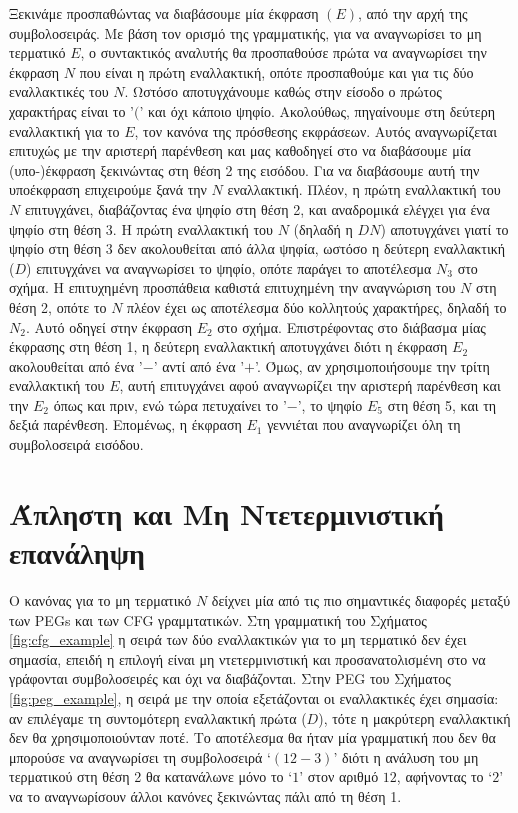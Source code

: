 \documentclass[diploma]{softlab-thesis}
\begin{document}
Ξεκινάμε προσπαθώντας να διαβάσουμε μία έκφραση $(E)$, από την αρχή της συμβολοσειράς.
Με βάση τον ορισμό της γραμματικής, για να αναγνωρίσει το μη τερματικό $E$, ο συντακτικός αναλυτής θα προσπαθούσε πρώτα να αναγνωρίσει την έκφραση $N$ που είναι η πρώτη εναλλακτική, οπότε προσπαθούμε και για τις δύο εναλλακτικές του $N$. Ωστόσο αποτυγχάνουμε καθώς στην είσοδο ο πρώτος χαρακτήρας είναι το '$($' και όχι κάποιο ψηφίο. 
Ακολούθως, πηγαίνουμε στη δεύτερη εναλλακτική για το $E$, τον κανόνα της πρόσθεσης εκφράσεων. 
Αυτός αναγνωρίζεται επιτυχώς με την αριστερή παρένθεση και μας καθοδηγεί στο να διαβάσουμε μία (υπο-)έκφραση ξεκινώντας στη θέση 2 της εισόδου.
Για να διαβάσουμε αυτή την υποέκφραση επιχειρούμε ξανά την $N$ εναλλακτική.
Πλέον, η πρώτη εναλλακτική του $N$ επιτυγχάνει, διαβάζοντας ένα ψηφίο στη θέση 2, και αναδρομικά ελέγχει για ένα ψηφίο στη θέση 3. 
Η πρώτη εναλλακτική του $N$ (δηλαδή η $D N$) αποτυγχάνει γιατί το ψηφίο στη θέση 3 δεν ακολουθείται από άλλα ψηφία, ωστόσο η δεύτερη εναλλακτική ($D$) επιτυγχάνει να αναγνωρίσει το ψηφίο, οπότε παράγει το αποτέλεσμα $N_3$ στο σχήμα. 
Η επιτυχημένη προσπάθεια καθιστά επιτυχημένη την αναγνώριση του $N$ στη θέση 2, οπότε το $N$ πλέον έχει ως αποτέλεσμα δύο κολλητούς χαρακτήρες, δηλαδή το $N_2$.
Αυτό οδηγεί στην έκφραση $E_2$ στο σχήμα. 
Επιστρέφοντας στο διάβασμα μίας έκφρασης στη θέση 1, η δεύτερη εναλλακτική αποτυγχάνει διότι η έκφραση $E_2$ ακολουθείται από ένα '$-$' αντί από ένα '$+$'.
Όμως, αν χρησιμοποιήσουμε την τρίτη εναλλακτική του $E$, αυτή επιτυγχάνει αφού αναγνωρίζει την αριστερή παρένθεση και την $E_2$ όπως και πριν, ενώ τώρα πετυχαίνει το '$-$', το ψηφίο $E_5$ στη θέση 5, και τη δεξιά παρένθεση. 
Επομένως, η έκφραση $E_1$ γεννιέται που αναγνωρίζει όλη τη συμβολοσειρά εισόδου.

\section{Άπληστη και Μη Ντετερμινιστική επανάληψη}
Ο κανόνας για το μη τερματικό $N$ δείχνει μία από τις πιο σημαντικές διαφορές μεταξύ των PEGs και των CFG γραμμτατικών.
Στη γραμματική του Σχήματος \ref{fig:cfg_example} η σειρά των δύο εναλλακτικών για το μη τερματικό δεν έχει σημασία, επειδή η επιλογή είναι μη ντετερμινιστική και προσανατολισμένη στο να γράφονται συμβολοσειρές και όχι να διαβάζονται.
Στην PEG του Σχήματος \ref{fig:peg_example}, η σειρά με την οποία εξετάζονται οι εναλλακτικές έχει σημασία: αν επιλέγαμε τη συντομότερη εναλλακτική πρώτα ($D$), τότε η μακρύτερη εναλλακτική δεν θα χρησιμοποιούνταν ποτέ.
Το αποτέλεσμα θα ήταν μία γραμματική που δεν θα μπορούσε να αναγνωρίσει τη συμβολοσειρά `$(12-3)$' διότι η ανάλυση του μη τερματικού στη θέση 2 θα κατανάλωνε μόνο το `$1$' στον αριθμό $12$, αφήνοντας το `$2$' να το αναγνωρίσουν άλλοι κανόνες ξεκινώντας πάλι από τη θέση 1.
\end{document}

